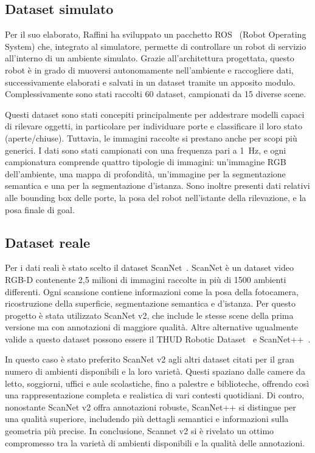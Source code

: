 \documentclass[12pt]{report}
\begin{document}
\subsection{Dataset simulato}
\label{sec:dataset_simulato}

Per il suo elaborato, Raffini ha sviluppato un pacchetto ROS~\cite{quigley2009ros} (Robot Operating System) che, integrato al simulatore, permette di controllare un robot di servizio all'interno di un ambiente simulato. Grazie all'architettura progettata, questo robot è in grado di muoversi autonomamente nell'ambiente e raccogliere dati, successivamente elaborati e salvati in un dataset tramite un apposito modulo. Complessivamente sono stati raccolti 60 dataset, campionati da 15 diverse scene.

Questi dataset sono stati concepiti principalmente per addestrare modelli capaci di rilevare oggetti, in particolare per individuare porte e classificare il loro stato (aperte/chiuse). Tuttavia, le immagini raccolte si prestano anche per scopi più generici. I dati sono stati campionati con una frequenza pari a \SI{1}{\hertz}, e ogni campionatura comprende quattro tipologie di immagini: un'immagine RGB dell'ambiente, una mappa di profondità, un'immagine per la segmentazione semantica e una per la segmentazione d'istanza. Sono inoltre presenti dati relativi alle bounding box delle porte, la posa del robot nell'istante della rilevazione, e la posa finale di goal.

\subsection{Dataset reale}
\label{sec:dataset_reale}

Per i dati reali è stato scelto il dataset ScanNet~\cite{dai2017scannet}. ScanNet è un dataset video RGB-D contenente 2,5 milioni di immagini raccolte in più di 1500 ambienti differenti. Ogni scansione contiene informazioni come la posa della fotocamera, ricostruzione della superficie, segmentazione semantica e d'istanza. Per questo progetto è stata utilizzato ScanNet v2, che include le stesse scene della prima versione ma con annotazioni di maggiore qualità. Altre alternative ugualmente valide a questo dataset possono essere il THUD Robotic Dataset~\cite{10611489} e ScanNet++~\cite{yeshwanth2023scannethighfidelitydataset3d}.

In questo caso è stato preferito ScanNet v2 agli altri dataset citati per il gran numero di ambienti disponibili e la loro varietà. Questi spaziano dalle camere da letto, soggiorni, uffici e aule scolastiche, fino a palestre e biblioteche, offrendo così una rappresentazione completa e realistica di vari contesti quotidiani. Di contro, nonostante ScanNet v2 offra annotazioni robuste, ScanNet++ si distingue per una qualità superiore, includendo più dettagli semantici e informazioni sulla geometria più precise. In conclusione, Scannet v2 si è rivelato un ottimo compromesso tra la varietà di ambienti disponibili e la qualità delle annotazioni.
\end{document}

